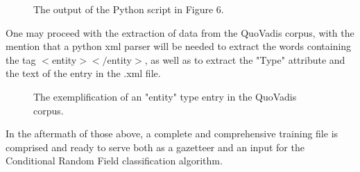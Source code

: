 \documentclass[12pt,a4paper]{article}
\begin{document}
\begin{figure}[h!]
\begin{center}
\end{center}
\caption{The output of the Python script in Figure 6.}
\end{figure}

\qquad One may proceed with the extraction of data from the QuoVadis corpus, with the mention that a python xml parser will be needed to extract the words containing the tag $<$entity$></$entity$>$, as well as to extract the "Type" attribute and the text of the entry in the .xml file.

\begin{figure}[h!]
\begin{center}
\end{center}
\caption{The exemplification of an "entity" type entry in the QuoVadis corpus.}
\end{figure}

\qquad In the aftermath of those above, a complete and comprehensive training file is comprised and ready to serve both as a gazetteer and an input for the Conditional
Random Field classification algorithm.
\end{document}
